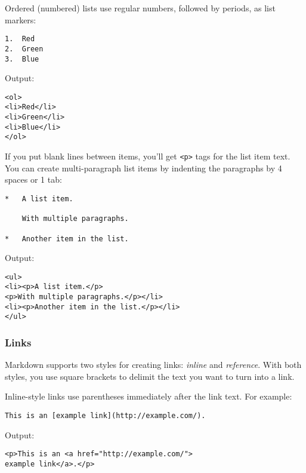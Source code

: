 Ordered (numbered) lists use regular numbers, followed by periods, as
list markers:

\begin{lstlisting}
1.  Red
2.  Green
3.  Blue
\end{lstlisting}




Output:

\begin{lstlisting}
<ol>
<li>Red</li>
<li>Green</li>
<li>Blue</li>
</ol>
\end{lstlisting}




If you put blank lines between items, you'll get \texttt{<p>} tags for the
list item text. You can create multi-paragraph list items by indenting
the paragraphs by 4 spaces or 1 tab:

\begin{lstlisting}
*   A list item.

    With multiple paragraphs.

*   Another item in the list.
\end{lstlisting}




Output:

\begin{lstlisting}
<ul>
<li><p>A list item.</p>
<p>With multiple paragraphs.</p></li>
<li><p>Another item in the list.</p></li>
</ul>
\end{lstlisting}


\subsubsection*{Links}




Markdown supports two styles for creating links: \emph{inline} and
\emph{reference}. With both styles, you use square brackets to delimit the
text you want to turn into a link.



Inline-style links use parentheses immediately after the link text.
For example:

\begin{lstlisting}
This is an [example link](http://example.com/).
\end{lstlisting}




Output:

\begin{lstlisting}
<p>This is an <a href="http://example.com/">
example link</a>.</p>
\end{lstlisting}




